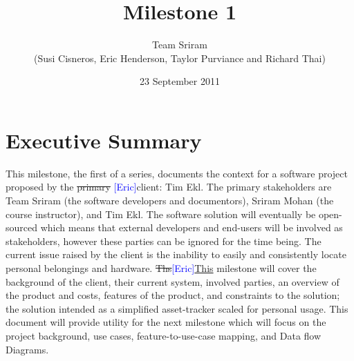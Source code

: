 \documentclass{article}
\newcommand{\eric}{\textcolor{blue}{[Eric]}}
\begin{document}
\setlength{\voffset}{3.5in}
\title{Milestone 1}
\author{Team Sriram\\
(Susi Cisneros, Eric Henderson, Taylor Purviance and Richard Thai)}
\date{23 September 2011}
\maketitle
\clearpage
\setlength{\voffset}{0pt}
\tableofcontents
\clearpage
\section{Executive Summary}
This milestone, the first of a series, documents the context for a software project proposed by the \sout{primary }\eric{}client: Tim Ekl. The primary stakeholders are Team Sriram (the software developers and documentors), Sriram Mohan (the course instructor), and Tim Ekl.  The software solution will eventually be open-sourced which means that external developers and end-users will be involved as stakeholders, however these parties can be ignored for the time being. The current issue raised by the client is the inability to easily and consistently locate personal belongings and hardware. \sout{Ths}\eric{}\uline{This} milestone will cover the background of the client, their current system, involved parties, an overview of the product and costs, features of the product, and constraints to the solution; the solution intended as a simplified asset-tracker scaled for personal usage. This document will provide utility for the next milestone which will focus on the project background, use cases, feature-to-use-case mapping, and Data flow Diagrams.
\end{document}
